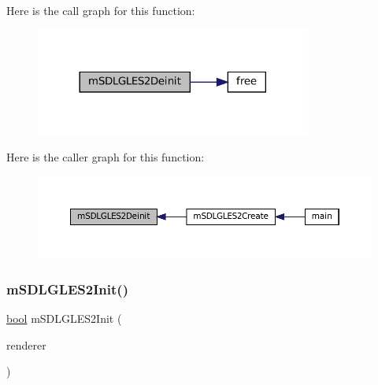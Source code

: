 Here is the call graph for this function\+:
\nopagebreak
\begin{figure}[H]
\begin{center}
\leavevmode
\includegraphics[width=257pt]{gles2-sdl_8c_a2d06ef5baf7a055c8ff28c80eb81b55c_cgraph}
\end{center}
\end{figure}
Here is the caller graph for this function\+:
\nopagebreak
\begin{figure}[H]
\begin{center}
\leavevmode
\includegraphics[width=350pt]{gles2-sdl_8c_a2d06ef5baf7a055c8ff28c80eb81b55c_icgraph}
\end{center}
\end{figure}
\mbox{\label{gles2-sdl_8c_a454611060aa8f426a7550bec2ef034b5}} 
\subsubsection{\texorpdfstring{m\+S\+D\+L\+G\+L\+E\+S2\+Init()}{mSDLGLES2Init()}}
{\footnotesize\ttfamily \mbox{\hyperlink{libretro_8h_a4a26dcae73fb7e1528214a068aca317e}{bool}} m\+S\+D\+L\+G\+L\+E\+S2\+Init (\begin{DoxyParamCaption}\item[{struct \mbox{\hyperlink{structm_s_d_l_renderer}{m\+S\+D\+L\+Renderer}} $\ast$}]{renderer }\end{DoxyParamCaption})\hspace{0.3cm}{\ttfamily [static]}}

